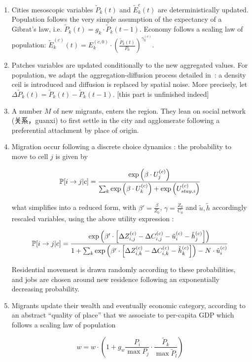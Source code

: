 \begin{enumerate}
\item Cities mesoscopic variables $\tilde{P}_k(t)$ and $\tilde{E}_k^{c}(t)$ are deterministically updated. Population follows the very simple assumption of the expectancy of a Gibrat's law, i.e. $\tilde{P}_k(t)= g_k \cdot \tilde{P}_k(t-1)$. Economy follows a scaling law of population: $\tilde{E}_k^{(c)}(t) = E_k^{(c,0)}\cdot \left(\frac{\tilde{P}_k(t)}{P_0}\right)^{\gamma_k^{(c)}}$.

\item Patches variables are updated conditionally to the new aggregated values. For population, we adapt the aggregation-diffusion process detailed in~\cite{raimbault2016calibration}: a density ceil is introduced and diffusion is replaced by spatial noise. More precisely, let $\Delta \tilde{P}_k(t) = \tilde{P}_k(t) - \tilde{P}_k(t-1)$. [this part is unfinished indeed]

\item A number $M$ of new migrants, enters the region. They lean on social network (关系，guanxi) 
to first settle in the city and agglomerate following a preferential attachment by place of origin.
\item Migration occur following a discrete choice dynamics : the probability to move to cell $j$ is given by

\[
\operatorname{\mathbb{P}}\!\left[i\rightarrow j | c\right] = \frac{\exp{\left(\beta\cdot U_j^{(c)}\right)}}{\sum_k \exp{\left(\beta\cdot U_k^{(c)}\right)}+\exp{\left(U_{stay,i}^{(c)}\right)}}
\]

what simplifies into a reduced form, with $\beta' = \frac{\beta}{Z_0}$, $\gamma = \frac{Z_0}{C_0}$ and $\tilde{u},\tilde{h}$ accordingly rescaled variables, using the above utility expression :

\[
\operatorname{\mathbb{P}}\!\left[i\rightarrow j | c\right] = \frac{\exp{\left(\beta'\cdot \left[\Delta Z_{i,j}^{(c)} - \Delta C_{i,j}^{(c)} - \tilde{u}_i^{(c)} - \tilde{h}_j^{(c)} \right] \right)}}{1 + \sum_k {\exp{\left(\beta'\cdot \left[\Delta Z_{i,k}^{(c)} - \Delta C_{i,k}^{(c)} - \tilde{h}_k^{(c)} \right] \right)} - N\cdot \tilde{u}_i^{(c)}}}
\]

Residential movement is drawn randomly according to these probabilities, and jobs are chosen around new residence following an exponentially decreasing probability.

\item Migrants update their wealth and eventually economic category, according to an abstract ``quality of place'' that we associate to per-capita GDP which follows a scaling law of population


\[
w = w\cdot \left( 1 + g_{w} \frac{P_i}{\max P_j} \cdot \frac{\tilde{P}_k}{\max \tilde{P}_l} \right)
\]

\end{enumerate}


